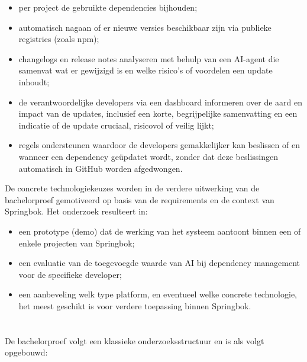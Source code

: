 \begin{itemize}
  \item per project de gebruikte dependencies bijhouden;
  \item automatisch nagaan of er nieuwe versies beschikbaar zijn via publieke registries (zoals npm);
  \item changelogs en release notes analyseren met behulp van een AI-agent die samenvat wat er gewijzigd is en welke risico's of voordelen een update inhoudt;
  \item de verantwoordelijke developers via een dashboard informeren over de aard en impact van de updates, inclusief een korte, begrijpelijke samenvatting en een indicatie of de update cruciaal, risicovol of veilig lijkt;
  \item regels ondersteunen waardoor de developers gemakkelijker kan beslissen of en wanneer een dependency geüpdatet wordt, zonder dat deze beslissingen automatisch in GitHub worden afgedwongen.
\end{itemize}

De concrete technologiekeuzes worden in de verdere uitwerking van de bachelorproef gemotiveerd op basis van de requirements en de context van Springbok. Het onderzoek resulteert in:

\begin{itemize}
  \item een prototype (demo) dat de werking van het systeem aantoont binnen een of enkele projecten van Springbok;
  \item een evaluatie van de toegevoegde waarde van AI bij dependency management voor de specifieke developer;
  \item een aanbeveling welk type platform, en eventueel welke concrete technologie, het meest geschikt is voor verdere toepassing binnen Springbok.
\end{itemize}

\section{}%
\label{sec:opzet-bachelorproef}


De bachelorproef volgt een klassieke onderzoeksstructuur en is als volgt opgebouwd:

